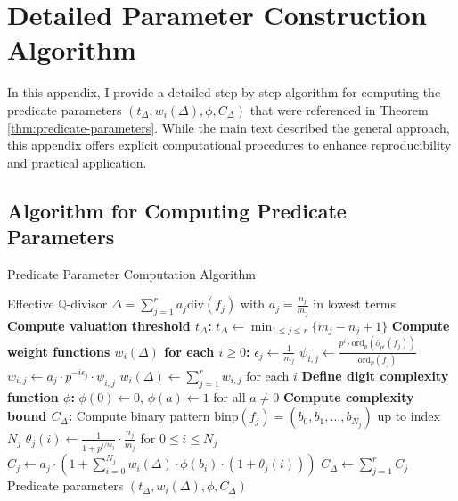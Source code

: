 \section{Detailed Parameter Construction Algorithm}\label{app:parameter-construction}

In this appendix, I provide a detailed step-by-step algorithm for computing the predicate parameters $(t_\Delta, w_i(\Delta), \phi, C_\Delta)$ that were referenced in Theorem \ref{thm:predicate-parameters}. While the main text described the general approach, this appendix offers explicit computational procedures to enhance reproducibility and practical application.

\subsection{Algorithm for Computing Predicate Parameters}

\begin{algorithm}[H]
\caption{Predicate Parameter Computation Algorithm}
\label{alg:parameter-computation}
\begin{algorithmic}[1]
\Require Effective $\mathbb{Q}$-divisor $\Delta = \sum_{j=1}^{r} a_j \text{div}(f_j)$ with $a_j = \frac{n_j}{m_j}$ in lowest terms
\State \textbf{Compute valuation threshold $t_\Delta$:}
\State \quad $t_\Delta \gets \min_{1 \leq j \leq r} \{m_j - n_j + 1\}$
\State \textbf{Compute weight functions $w_i(\Delta)$ for each $i \geq 0$:}
    \State $\epsilon_j \gets \frac{1}{m_j}$ 
     
        \State $\psi_{i,j} \gets \frac{p^i \cdot \text{ord}_p(\partial_{p^i}(f_j))}{\text{ord}_p(f_j)}$ 
        \State $w_{i,j} \gets a_j \cdot p^{-i\epsilon_j} \cdot \psi_{i,j}$ 
    \EndFor
\EndFor
\State $w_i(\Delta) \gets \sum_{j=1}^{r} w_{i,j}$ for each $i$
\State \textbf{Define digit complexity function $\phi$:}
\State $\phi(0) \gets 0$, $\phi(a) \gets 1$ for all $a \neq 0$
\State \textbf{Compute complexity bound $C_\Delta$:}
    \State Compute binary pattern $\text{binp}(f_j) = (b_0, b_1, \ldots, b_{N_j})$ up to index $N_j$
    \State $\theta_j(i) \gets \frac{1}{1 + p^{i/m_j}} \cdot \frac{n_j}{m_j}$ for $0 \leq i \leq N_j$ 
    \State $C_j \gets a_j \cdot \left(1 + \sum_{i=0}^{N_j} w_i(\Delta) \cdot \phi(b_i) \cdot (1 + \theta_j(i))\right)$ 
\EndFor
\State $C_\Delta \gets \sum_{j=1}^{r} C_j$ 
\Ensure Predicate parameters $(t_\Delta, w_i(\Delta), \phi, C_\Delta)$
\end{algorithmic}
\end{algorithm}

